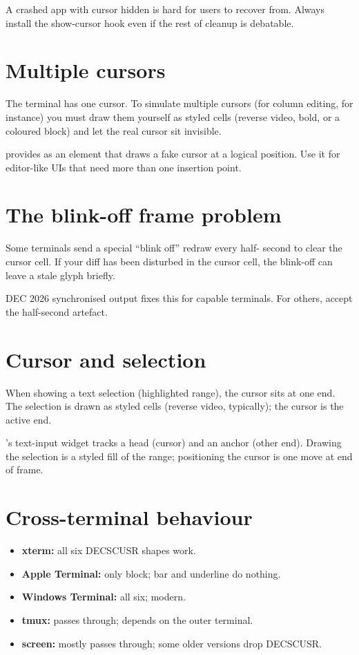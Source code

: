 \begin{warning}
A crashed app with cursor hidden is hard for users to
recover from. Always install the show-cursor hook even if
the rest of cleanup is debatable.
\end{warning}

\section{Multiple cursors}

The terminal has one cursor. To simulate multiple cursors
(for column editing, for instance) you must draw them yourself
as styled cells (reverse video, bold, or a coloured block) and
let the real cursor sit invisible.

\maya{} provides  as an element that draws a fake
cursor at a logical position. Use it for editor-like UIs that
need more than one insertion point.

\section{The blink-off frame problem}

Some terminals send a special ``blink off'' redraw every half-
second to clear the cursor cell. If your diff has been
disturbed in the cursor cell, the blink-off can leave a stale
glyph briefly.

DEC 2026 synchronised output fixes this for capable terminals.
For others, accept the half-second artefact.

\section{Cursor and selection}

When showing a text selection (highlighted range), the cursor
sits at one end. The selection is drawn as styled cells
(reverse video, typically); the cursor is the active end.

\maya{}'s text-input widget tracks a head (cursor) and an
anchor (other end). Drawing the selection is a styled fill of
the range; positioning the cursor is one move at end of frame.

\section{Cross-terminal behaviour}

\begin{itemize}[leftmargin=*]
  \item \textbf{xterm:} all six DECSCUSR shapes work.
  \item \textbf{Apple Terminal:} only block; bar and underline
    do nothing.
  \item \textbf{Windows Terminal:} all six; modern.
  \item \textbf{tmux:} passes through; depends on the outer
    terminal.
  \item \textbf{screen:} mostly passes through; some older
    versions drop DECSCUSR.
\end{itemize}

